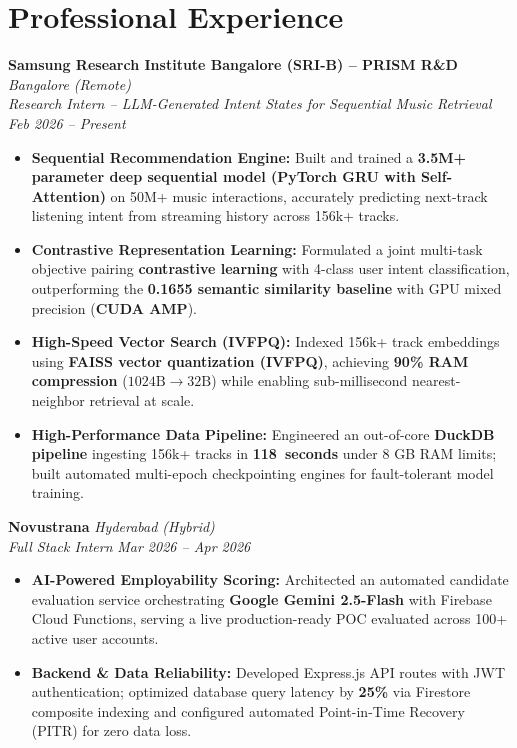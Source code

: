 \documentclass[10pt, a4paper]{article}
\begin{document}
\section*{Professional Experience}
\noindent
\textbf{Samsung Research Institute Bangalore (SRI-B) -- PRISM R\&D} \hfill \textit{Bangalore (Remote)} \\
\textit{Research Intern -- LLM-Generated Intent States for Sequential Music Retrieval} \hfill \textit{Feb 2026 -- Present}
\begin{itemize}
    \item \textbf{Sequential Recommendation Engine:} Built and trained a \textbf{3.5M+ parameter deep sequential model (PyTorch GRU with Self-Attention)} on 50M+ music interactions, accurately predicting next-track listening intent from streaming history across 156k+ tracks.
    \item \textbf{Contrastive Representation Learning:} Formulated a joint multi-task objective pairing \textbf{contrastive learning} with 4-class user intent classification, outperforming the \textbf{0.1655 semantic similarity baseline} with GPU mixed precision (\textbf{CUDA AMP}).
    \item \textbf{High-Speed Vector Search (IVFPQ):} Indexed 156k+ track embeddings using \textbf{FAISS vector quantization (IVFPQ)}, achieving \textbf{90\% RAM compression} ($1024\text{B} \to 32\text{B}$) while enabling sub-millisecond nearest-neighbor retrieval at scale.
    \item \textbf{High-Performance Data Pipeline:} Engineered an out-of-core \textbf{DuckDB pipeline} ingesting 156k+ tracks in \mbox{\textbf{118 seconds}} under 8 GB RAM limits; built automated multi-epoch checkpointing engines for fault-tolerant model training.
\end{itemize}

\vspace{0.09ex}
\noindent
\textbf{Novustrana} \hfill \textit{Hyderabad (Hybrid)} \\
\textit{Full Stack Intern} \hfill \textit{Mar 2026 -- Apr 2026}
\begin{itemize}
    \item \textbf{AI-Powered Employability Scoring:} Architected an automated candidate evaluation service orchestrating \textbf{Google Gemini 2.5-Flash} with Firebase Cloud Functions, serving a live production-ready POC evaluated across 100+ active user accounts.
    \item \textbf{Backend \& Data Reliability:} Developed Express.js API routes with JWT authentication; optimized database query latency by \textbf{25\%} via Firestore composite indexing and configured automated Point-in-Time Recovery (PITR) for zero data loss.
\end{itemize}
\end{document}
